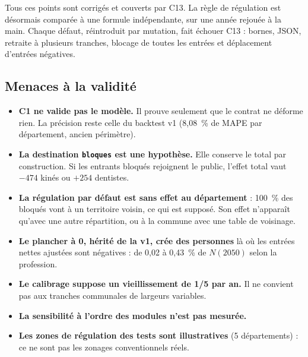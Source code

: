Tous ces points sont corrigés et couverts par C13. La règle de régulation est désormais comparée à
une formule indépendante, sur une année rejouée à la main. Chaque défaut, réintroduit par mutation,
fait échouer C13 : bornes, JSON, retraite à plusieurs tranches, blocage de toutes les entrées et
déplacement d'entrées négatives.

\subsection{Menaces à la validité}
\begin{itemize}
  \item \textbf{C1 ne valide pas le modèle.} Il prouve seulement que le contrat ne déforme rien. La
        précision reste celle du backtest v1 (8,08\mesure{}~\% de MAPE par département, ancien
        périmètre).
  \item \textbf{La destination \texttt{bloques} est une hypothèse.} Elle conserve le total par
        construction. Si les entrants bloqués rejoignent le public, l'effet total vaut
        $-474$\mesure{} kinés ou $+254$\mesure{} dentistes.
  \item \textbf{La régulation par défaut est sans effet au département} : 100~\% des bloqués vont à
        un territoire voisin, ce qui est supposé. Son effet n'apparaît qu'avec une autre répartition,
        ou à la commune avec une table de voisinage.
  \item \textbf{Le plancher à 0, hérité de la v1, crée des personnes} là où les entrées nettes
        ajustées sont négatives : de 0,02\mesure{} à 0,43\mesure{}~\% de $N(2050)$ selon la
        profession.
  \item \textbf{Le calibrage suppose un vieillissement de 1/5 par an.} Il ne convient pas aux tranches
        communales de largeurs variables.
  \item \textbf{La sensibilité à l'ordre des modules n'est pas mesurée.}
  \item \textbf{Les zones de régulation des tests sont illustratives} (5 départements) : ce ne sont
        pas les zonages conventionnels réels.
\end{itemize}

